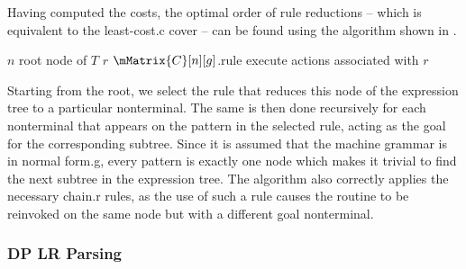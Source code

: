 Having computed the costs, the optimal order of \glspl{rule reduction} -- which
is equivalent to the \gls{least-cost.c} \gls{cover} -- can be found using the
algorithm shown in .
%
\begin{algorithm}[t]
  {%
    $n$ \Assign root node of $T$\;
    $r$ \Assign $\mMatrix{C}[n][g]$.rule\;
    execute actions associated with $r$\;
  }

  \caption[Algorithm for selecting the optimal sequence of rules]%
          {%
            Selects optimal sequence of rules that reduces a given expression
            tree to a given nonterminal, based on costs computed
            by %
          }
\end{algorithm}
%
Starting from the \gls{root}, we select the \gls{rule} that reduces this
\gls{node} of the \gls{expression tree} to a particular \gls{nonterminal}.
%
The same is then done recursively for each \gls{nonterminal} that appears on the
pattern in the selected \gls{rule}, acting as the goal for the corresponding
\gls{subtree}.
%
Since it is assumed that the \gls{machine grammar} is in \gls{normal form.g},
every \gls{pattern} is exactly one \gls{node} which makes it trivial to find the
next \gls{subtree} in the \gls{expression tree}.
%
The algorithm also correctly applies the necessary \gls{chain.r} \glspl{rule},
as the use of such a \gls{rule} causes the routine to be reinvoked on the same
\gls{node} but with a different goal \gls{nonterminal}.


\subsubsection{DP \versus LR Parsing}

